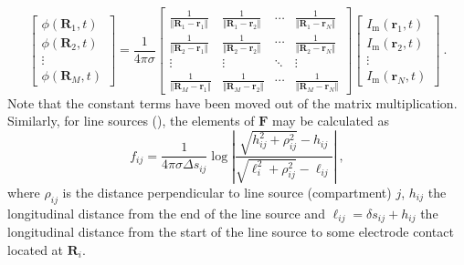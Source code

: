 \begin{equation}
\begin{bmatrix}
\phi(\mathbf{R}_1, t) \\
\phi(\mathbf{R}_2, t) \\
\vdots \\
\phi(\mathbf{R}_M, t)
\end{bmatrix}
= \frac{1}{4\pi\sigma}
\begin{bmatrix}
\frac{1}{\Vert\mathbf{R}_1 - \mathbf{r}_1\Vert} & \frac{1}{\Vert\mathbf{R}_1 - \mathbf{r}_2\Vert} & \cdots & \frac{1}{\Vert\mathbf{R}_1 - \mathbf{r}_N\Vert} \\
\frac{1}{\Vert\mathbf{R}_2 - \mathbf{r}_1\Vert} & \frac{1}{\Vert\mathbf{R}_2 - \mathbf{r}_2\Vert} & \cdots & \frac{1}{\Vert\mathbf{R}_2 - \mathbf{r}_N\Vert} \\
\vdots & \vdots & \ddots & \vdots \\
\frac{1}{\Vert\mathbf{R}_M - \mathbf{r}_1\Vert} & \frac{1}{\Vert\mathbf{R}_M - \mathbf{r}_2\Vert} & \cdots & \frac{1}{\Vert\mathbf{R}_M - \mathbf{r}_N\Vert}
\end{bmatrix}
\begin{bmatrix}
I_\mathrm{m}(\mathbf{r}_1, t) \\
I_\mathrm{m}(\mathbf{r}_2, t) \\
\vdots \\
I_\mathrm{m}(\mathbf{r}_N, t)
\end{bmatrix} ~.
\end{equation}
%
Note that the constant terms have been moved out of the matrix multiplication.
Similarly, for line sources (), the elements of $\mathbf{F}$ may be calculated as
%
\begin{equation}
f_{ij} = \frac{1}{4\pi \sigma \Delta s_{ij}} \log \left| \frac{\sqrt{h_{ij}^2+\rho_{ij}^2}-h_{ij}}{\sqrt{\ell_i^2+\rho_{ij}^2}-\ell_{ij}} \right| ~,
\label{eq:LFPy:linesources}
\end{equation}
%
where $\rho_{ij}$ is the distance perpendicular to line source (compartment) $j$,
$h_{ij}$ the longitudinal distance from the end of the line source
and $\ell_{ij} = \delta s_{ij} + h_{ij}$ the longitudinal distance from the start of the line source to some electrode contact located at $\mathbf{R}_i$.

